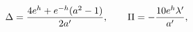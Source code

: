 \begin{equation}
\Delta={4e^h+e^{-h}(a^2-1) \over 2a' }, \qquad \Pi=-{10e^h\lambda' \over a' }, \label{delta2}
\end{equation}

